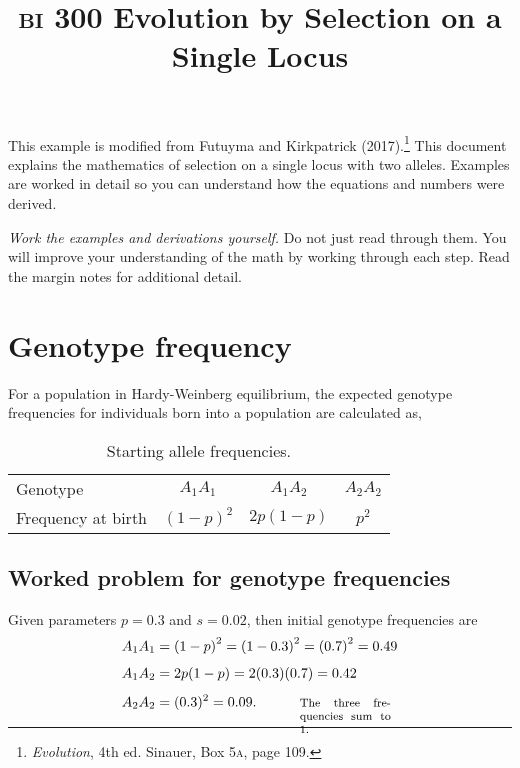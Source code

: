 \documentclass[letterpaper,nofonts]{tufte-handout}
\title{{\scshape bi} 300 Evolution by Selection on a Single Locus}
\date{} %
\def\mathnote#1{%
  \tag*{\rlap{\hspace\marginparsep\smash{\parbox[t]{\marginparwidth}{%
  \footnotesize#1}}}}
}
\begin{document}
\maketitle	%


This example is modified from Futuyma and Kirkpatrick (2017).\footnote{\textit{Evolution}, 4th ed. Sinauer, Box 5\textsc{a}, page 109.} This document explains the mathematics of selection on a single locus with two alleles. Examples are worked in detail so  you can understand how the equations and numbers were derived.

\emph{Work the examples and derivations yourself.} Do not just read through them. You will improve your understanding of the math by working through each step. Read the margin notes for additional detail.

\section*{Genotype frequency}

For a population in Hardy-Weinberg equilibrium, the expected genotype frequencies for individuals born into a population are calculated as,

\begin{table}
\begin{tabular}{@{}lccc@{}}
\caption{Starting allele frequencies.}\label{tab:hwe}
Genotype	& 
$A_1A_1$	& 
$A_1A_2$	& 
$A_2A_2$ 	\tabularnewline[0.5em]
%
Frequency at birth		&
$\left(1-p\right)^2$	&
$2p\left(1-p\right)$	&
$p^2$ 					\tabularnewline
%
\end{tabular}
\end{table}


\subsection*{Worked problem for genotype frequencies}

Given parameters $p = 0.3$ and $s = 0.02$, then initial genotype frequencies are
{\setlength{\jot}{0.8em}
\begin{align*}
A_1A_1 &= \left(1-p\right)^2 = \left(1 - 0.3\right)^2 = \left(0.7\right)^2 = 0.49\\[1ex]
A_1A_2 &= 2p(1-p) = 2(0.3)(0.7) = 0.42\\[1ex]
A_2A_2 &= (0.3)^2 = 0.09.\mathnote{The three frequencies sum to 1.}
\end{align*}
}
\end{document}
